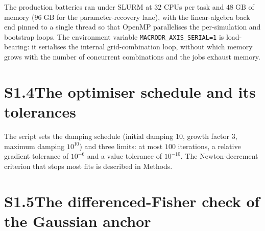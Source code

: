 \documentclass[11pt]{article}
\begin{document}
The production batteries ran under SLURM at $32$ CPUs per task and $48\;\mathrm{GB}$
of memory ($96\;\mathrm{GB}$ for the parameter-recovery lane), with the linear-algebra
back end pinned to a single thread so that OpenMP parallelises the per-simulation and
bootstrap loops. The environment variable
\texttt{MACRODR\_\allowbreak AXIS\_\allowbreak SERIAL=1} is
load-bearing: it serialises the internal grid-combination loop, without which memory
grows with the number of concurrent combinations and the jobs exhaust memory.

\section*{S1.4\quad The optimiser schedule and its tolerances}

The script sets the damping schedule (initial damping $10$, growth
factor $3$, maximum damping $10^{10}$) and three limits: at most $100$ iterations, a
relative gradient tolerance of $10^{-6}$ and a value tolerance of $10^{-10}$.
The Newton-decrement criterion that stops most fits is described in Methods.

\section*{S1.5\quad The differenced-Fisher check of the Gaussian anchor}

\end{document}
